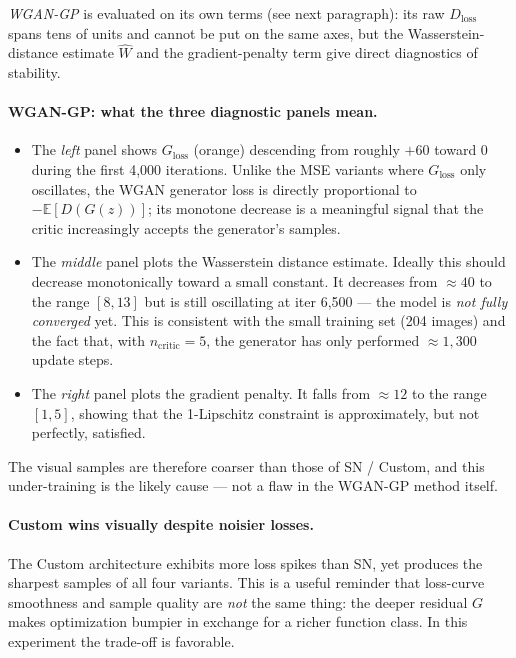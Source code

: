 \documentclass[11pt]{article}
\begin{document}
\noindent\textit{WGAN-GP} is evaluated on its own terms (see next paragraph):
its raw $D_\text{loss}$ spans tens of units and cannot be put on the same
axes, but the Wasserstein-distance estimate $\hat W$ and the gradient-penalty
term give direct diagnostics of stability.

\paragraph{WGAN-GP: what the three diagnostic panels mean.}
\begin{itemize}
    \item The \emph{left} panel shows $G_\text{loss}$ (orange) descending from
    roughly $+60$ toward $0$ during the first 4{,}000 iterations. Unlike the
    MSE variants where $G_\text{loss}$ only oscillates, the WGAN generator
    loss is directly proportional to $-\mathbb{E}[D(G(z))]$; its monotone
    decrease is a meaningful signal that the critic increasingly accepts the
    generator's samples.
    \item The \emph{middle} panel plots the Wasserstein distance estimate.
    Ideally this should decrease monotonically toward a small constant. It
    decreases from $\approx\!40$ to the range $[8,13]$ but is still
    oscillating at iter 6{,}500 — the model is \emph{not fully converged} yet.
    This is consistent with the small training set (204 images) and the fact
    that, with $n_\text{critic}{=}5$, the generator has only performed
    $\approx\!1{,}300$ update steps.
    \item The \emph{right} panel plots the gradient penalty. It falls from
    $\approx\!12$ to the range $[1,5]$, showing that the 1-Lipschitz
    constraint is approximately, but not perfectly, satisfied.
\end{itemize}
The visual samples are therefore coarser than those of SN / Custom, and this
under-training is the likely cause — not a flaw in the WGAN-GP method itself.

\paragraph{Custom wins visually despite noisier losses.}
The Custom architecture exhibits more loss spikes than SN, yet produces the
sharpest samples of all four variants. This is a useful reminder that
loss-curve smoothness and sample quality are \emph{not} the same thing: the
deeper residual $G$ makes optimization bumpier in exchange for a richer
function class. In this experiment the trade-off is favorable.
\end{document}
